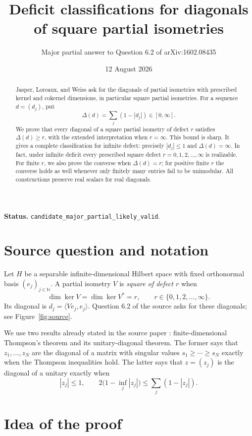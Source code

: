 \documentclass[11pt]{article}
\title{Deficit classifications for diagonals of square partial isometries}
\author{Major partial answer to Question 6.2 of arXiv:1602.08435}
\date{12 August 2026}
\newcommand{\N}{\mathbb N}
\begin{document}
\maketitle

\noindent\textbf{Status.} \texttt{candidate\_major\_partial\_likely\_valid}.

\begin{abstract}
Jasper, Loreaux, and Weiss ask for the diagonals of partial isometries with
prescribed kernel and cokernel dimensions, in particular square partial
isometries.  For a sequence $d=(d_j)$, put
\[
 \Delta(d)=\sum_j(1-|d_j|)\in[0,\infty].
\]
We prove that every diagonal of a square partial isometry of defect $r$
satisfies $\Delta(d)\ge r$, with the extended interpretation when
$r=\infty$.  This bound is sharp.  It gives a complete classification for
infinite defect: precisely $|d_j|\le1$ and $\Delta(d)=\infty$.  In fact,
under infinite deficit every prescribed square defect
$r=0,1,2,\ldots,\infty$ is realizable.  For finite $r$, we also prove the
converse when $\Delta(d)=r$; for positive finite $r$ the converse holds as
well whenever only finitely many entries fail to be unimodular.  All
constructions preserve real scalars for real diagonals.
\end{abstract}

\section{Source question and notation}

Let $H$ be a separable infinite-dimensional Hilbert space with fixed
orthonormal basis $(e_j)_{j\in\N}$.  A partial isometry $V$ is
\emph{square of defect $r$} when
\[
 \dim\ker V=\dim\ker V^*=r,
 \qquad r\in\{0,1,2,\ldots,\infty\}.
\]
Its diagonal is $d_j=\langle Ve_j,e_j\rangle$.  Question 6.2 of the source
asks for these diagonals; see Figure~\ref{fig:source}.

We use two results already stated in the source paper \cite{source}:
finite-dimensional Thompson's theorem and its unitary-diagonal theorem.  The
former says that $z_1,\ldots,z_N$ are the diagonal of a matrix with singular
values $s_1\ge\cdots\ge s_N$ exactly when the Thompson inequalities hold.
The latter says that $z=(z_j)$ is the diagonal of a unitary exactly when
\[
 |z_j|\le1,
 \qquad
 2\bigl(1-\inf_j|z_j|\bigr)
 \le \sum_j(1-|z_j|).
\tag{1}\label{eq:unitary}
\]

\section{Idea of the proof}
\end{document}
